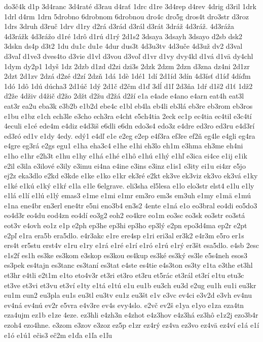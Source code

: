 {do3č4k
d1p
3d4ranc
3d4raté
d3rau
d4rať
1drc
d1re
3d4rep
d4rev
4drig
d3ril
1drk
1drl
d4rm
1drn
5drobno
6drobnom
6drobnou
dro4c
dro5g
dros4t
dro3str
d3roz
1drs
3druh
d3ruč
1drv
d1ry
d2rá
d3rád
d3rál
d3rát
3dráž
4d3ráž.
4d3ráža
4d3rážk
4d3rážo
d1ré
1drô
d1rú
d1rý
2d1s2
3dsaya
3dsayh
3dsayo
d2sb
dsk2
3dskn
ds4p
d3t2
1du
du1c
du1e
4dur
dus3t
4d3u3tv
4d3uče
4d3už
dv2
d3val
d3vaľ
d1ve3
dves4to
d3vie
d1vl
d3vou
d3voľ
d1vr
d1vy
dvy4kl
d1vá
d1vä
dy4chl
1dym
dy2p1
1dyš
1dz
2dzb
d1zd
d2zi
dzi3s
2dzk
2dzm
2dzn
d3zna
dz4ni
2d1zr
2dzt
2d1zv
2dzá
d2zé
d2zí
2dzň
1dá
1dè
1dé1
1dí
2d1íd
3dín
4d3ísť
d1íď
4díďm
1dó
1dô
1dú
dúcha3
2d1úč
1dý
2d1č
d2čm
d1ď
3dĺ
d1ľ
2d3ňa
1dŕ
d1š2
d1ť
1dž2
d2že
4dživ
d4žič
d2žo
2džt
d2žu
d2žá
d2ží
e1a
e4ade
e4ano
e4arn
eat4h
eat3l
eat3r
ea2u
eba3k
e3b2b
e1b2d
ebe4c
e1bl
eb4la
eb4li
eb3lá
eb3re
eb3rom
eb3ros
e1bu
e1bz
e1ch
ech3le
e3cho
ech3ra
e4cht
e5ch4tia
2eck
ec1p
ec4tia
ec4til
e3c4tí
4eculi
e1cé
ede4m
e4diz
e4d3iš
e6dli
e6dn
edo3s4
edo3z
e4dre
ed3ro
ed3ru
e4d3rí
ed3ró
ed1v
e1dy
4edy.
edý1
e4dľ
e1e
e2eg
e2ep
e4f3ra
ef3re
ef2ň
eg4le
e4gli
eg4ra
e4gre
eg3rá
e2gs
egu1
e1ha
eha3c4
e1he
e1hi
eh3lo
eh1m
e3hma
eh3me
eh4ni
e1ho
e1hr
e2h3t
e1hu
e1hy
e1há
e1hé
e1hô
e1hú
e1hý
e1hľ
e3ica
ei4ce
e1ij
e1ik
e2il
e3ila
e3ilové
e3ily
e3imu
ei4na
e4ine
e3ins
e3inz
e1is1
e3ity
ei1u
ei4zr
e5jo
ej2z
eka3dlo
e2kd
e3kde
e1ke
e1ko
e1kr
ek3ré
e2kt
ek3ve
ek3viz
ek3vo
ek3vá
e1ky
e1ké
e1kú
e1ký
e1kŕ
e1la
e1le
6elgrave.
eli3sha
el5lesa
e1lo
elo3str
elst4
e1lu
e1ly
e1lá
e1lí
e1lú
e1lý
emas3
e1me
e1mi
e1mr
em3ro
em3s
em3uh
e1my
e1mä
e1mú
e1na
ene4br
en3erl
ene4tr
e5ni
eno3b4
en3s2
4ente
e1ná
e1o
eo3bral
eo4di
eo5do3
eo4d3r
eo4du
eod4zn
eo4dí
eo3g2
eoh2
eo4kre
eo1m
eo3sc
eo3sk
eo3str
eo3stá
eot3v
e4ovh
eo1z
e1p
e2ph
ep3he
ep3hi
ep3ho
ep3lý
e2pn
epo3d4ma
ep2r
e2pt
e2pľ
e1ra
era5b
era5dlo.
e4r3akc
e1re
ere4sp
e1ri
eri3al
er3k2
e4r3m
e5ro
er1s
ers4t
er5stu
erst4v
e1ru
e1ry
e1rá
e1ré
e1rí
e1ró
e1rú
e1rý
er3št
esa5dlo.
e4sb
2esc
e1s2f
es1h
es3ke
es3kom
e3skop
es3kou
es4kup
es3ké
es3ký
es3le
e5s4neh
esos3
es3pek
es4tajn
es3tanc
es3taní
es3tat
e4ste
es4tie
e4s3ton
es3ty
e1ta
e3the
et3hl
et3hr
e4tli
e2t1m
e1to
eto4v3r
et3ri
et3ro
et3ru
et5rác
et3rál
et3rí
e1tu
etu3c
et3ve
et3vi
et3vu
et3ví
e1ty
e1tá
e1tú
e1u
eu1b
eu3ch
eu3d
e2ug
eu1h
eu1i
eu3kr
eu1m
eun2
eu3pla
eu1s
eu3tl
eu3tv
eu1z
eu3št
e1v
e3vc
ev4ci
e3v2d
e3vh
ev4nu
ev4ná
ev4nú
ev2r
e5vra
e4v3re
ev4s
evy4slo.
e2vč
ev2š
e1ya
e1yo
e1za
eza4tn
eza4ujm
ez1b
e1ze
4eze.
ez3hli
e4zh3n
e4zhot
e4z3hov
e4z3há
ez3hô
e1z2j
ezo3b4r
ezoh4
ezo4hne.
e3zom
e3zov
e3zoz
ez5p
e1zr
ez4rý
ez4va
ez3vo
ez4vä
ez4ví
e1á
e1í
e1ó
e1ú1
ečis3
eč2m
e1ďa
e1ľa
e1ľu
}
